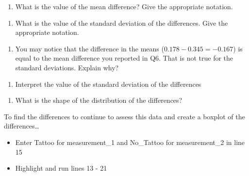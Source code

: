 \documentclass[
]{report}
\providecommand{\tightlist}{%
  \setlength{\itemsep}{0pt}\setlength{\parskip}{0pt}}
\begin{document}
\begin{enumerate}
\def\labelenumi{\arabic{enumi}.}
\setcounter{enumi}{5}
\tightlist
\item
  What is the value of the mean difference? Give the appropriate notation.
\end{enumerate}

\vspace{0.2in}

\begin{enumerate}
\def\labelenumi{\arabic{enumi}.}
\setcounter{enumi}{6}
\tightlist
\item
  What is the value of the standard deviation of the differences. Give the appropriate notation.
\end{enumerate}

\vspace{0.2in}

\begin{enumerate}
\def\labelenumi{\arabic{enumi}.}
\setcounter{enumi}{7}
\tightlist
\item
  You may notice that the difference in the means (\(0.178 - 0.345 = -0.167\)) is equal to the mean difference you reported in Q6. That is not true for the standard deviations. Explain why?
\end{enumerate}

\vspace{0.8in}

\begin{enumerate}
\def\labelenumi{\arabic{enumi}.}
\setcounter{enumi}{8}
\tightlist
\item
  Interpret the value of the standard deviation of the differences
\end{enumerate}

\vspace{0.6in}

\begin{enumerate}
\def\labelenumi{\arabic{enumi}.}
\setcounter{enumi}{9}
\tightlist
\item
  What is the shape of the distribution of the differences?
\end{enumerate}

\vspace{0.3in}

To find the differences to continue to assess this data and create a boxplot of the differences\ldots{}

\begin{itemize}
\item
  Enter Tattoo for measurement\_1 and No\_Tattoo for measurement\_2 in line 15
\item
  Highlight and run lines 13 - 21
\end{itemize}
\end{document}
